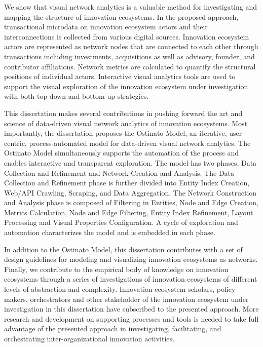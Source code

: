 We show that visual network analytics is a valuable method for investigating and mapping the structure of innovation ecosystems. In the proposed approach, transactional microdata on innovation ecosystem actors and their interconnections is collected from various digital sources. Innovation ecosystem actors are represented as network nodes that are connected to each other through transactions including investments, acquisitions as well as advisory, founder, and contributor affiliations. Network metrics are calculated to quantify the structural positions of individual actors. Interactive visual analytics tools are used to support the visual exploration of the innovation ecosystem under investigation with both top-down and bottom-up strategies. 

This dissertation makes several contributions in pushing forward the art and science of data-driven visual network analytics of innovation ecosystems. Most importantly, the dissertation proposes the Ostinato Model, an iterative, user-centric, process-automated model for data-driven visual network analytics. The Ostinato Model simultaneously supports the automation of the process and enables interactive and transparent exploration. The model has two phases, Data Collection and Refinement and Network Creation and Analysis. The Data Collection and Refinement phase is further divided into Entity Index Creation, Web/API Crawling, Scraping, and Data Aggregation. The Network Construction and Analysis phase is composed of Filtering in Entities, Node and Edge Creation, Metrics Calculation, Node and Edge Filtering, Entity Index Refinement, Layout Processing and Visual Properties Configuration. A cycle of exploration and automation characterizes the model and is embedded in each phase.

In addition to the Ostinato Model, this dissertation contributes with a set of design guidelines for modeling and visualizing innovation ecosystems as networks. Finally, we contribute to the empirical body of knowledge on innovation ecosystems through a series of investigations of innovation ecosystems of different levels of abstraction and complexity. Innovation ecosystem scholars, policy makers, orchestrators and other stakeholder of the innovation ecosystem under investigation in this dissertation have subscribed to the presented approach. More research and development on supporting processes and tools is needed to take full advantage of the presented approach in investigating, facilitating, and orchestrating inter-organizational innovation activities.